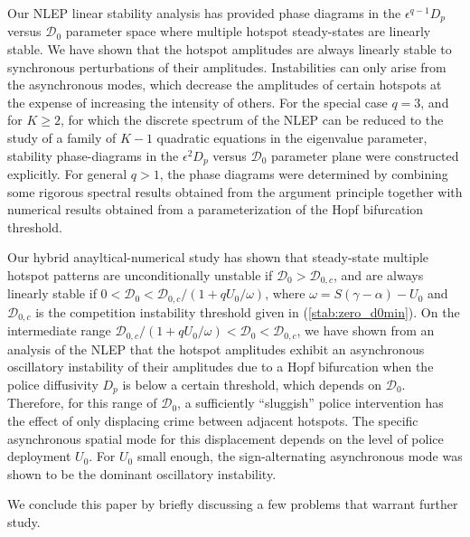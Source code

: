 \documentclass{article}%
\begin{document}
Our NLEP linear stability analysis has provided phase diagrams in the
$\epsilon^{q-1} D_{p}$ versus ${\mathcal D}_0$ parameter space where
multiple hotspot steady-states are linearly stable. We have shown that
the hotspot amplitudes are always linearly stable to synchronous
perturbations of their amplitudes. Instabilities can only arise from
the asynchronous modes, which decrease the amplitudes of certain
hotspots at the expense of increasing the intensity of others. For the
special case $q=3$, and for $K\geq 2$, for which the discrete spectrum
of the NLEP can be reduced to the study of a family of $K-1$ quadratic
equations in the eigenvalue parameter, stability phase-diagrams in the
$\epsilon^{2} D_p$ versus ${\mathcal D}_0$ parameter plane were constructed
explicitly. For general $q>1$, the phase diagrams were determined by
combining some rigorous spectral results obtained from the argument
principle together with numerical results obtained from a
parameterization of the Hopf bifurcation threshold.

Our hybrid anayltical-numerical study has shown that steady-state
multiple hotspot patterns are unconditionally unstable if ${\mathcal
  D}_0>{\mathcal D}_{0,c}$, and are always linearly stable if
$0<{\mathcal D}_0< {\mathcal D}_{0,c}/(1+qU_0/\omega)$, where
$\omega=S(\gamma-\alpha)-U_0$ and ${\mathcal D}_{0,c}$ is the
competition instability threshold given in (\ref{stab:zero_d0min}). On
the intermediate range ${\mathcal D}_{0,c}/(1+qU_0/\omega)<{\mathcal
  D}_0<{\mathcal D}_{0,c}$, we have shown from an analysis of the NLEP
that the hotspot amplitudes exhibit an asynchronous oscillatory
instability of their amplitudes due to a Hopf bifurcation when the
police diffusivity $D_p$ is below a certain threshold, which depends
on ${\mathcal D}_0$. Therefore, for this range of ${\mathcal D}_0$, a
sufficiently ``sluggish'' police intervention has the effect of only
displacing crime between adjacent hotspots. The specific asynchronous
spatial mode for this displacement depends on the level of police
deployment $U_0$. For $U_0$ small enough, the sign-alternating
asynchronous mode was shown to be the dominant oscillatory
instability.

We conclude this paper by briefly discussing a few problems that
warrant further study.
\end{document}
